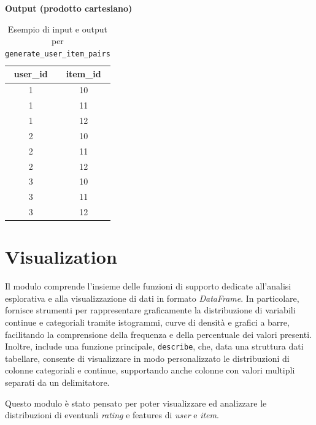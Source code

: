 \begin{itemize}
\begin{table}[H]
        \begin{minipage}{\textwidth}
            \centering
            \textbf{Output (prodotto cartesiano)}\\[0.5em]
            \begin{tabular}{|c|c|}
            \hline
            \textbf{user\_id} & \textbf{item\_id} \\
            \hline
            1 & 10 \\
            1 & 11 \\
            1 & 12 \\
            2 & 10 \\
            2 & 11 \\
            2 & 12 \\
            3 & 10 \\
            3 & 11 \\
            3 & 12 \\
            \hline
            \end{tabular}
        \end{minipage}
        \caption{Esempio di input e output per \texttt{generate\_user\_item\_pairs}}
    \end{table}
\end{itemize}


\section{Visualization}
Il modulo comprende l'insieme delle funzioni di supporto dedicate all'analisi esplorativa e alla visualizzazione di dati in formato \textit{DataFrame}. In particolare, fornisce strumenti per rappresentare graficamente la distribuzione di variabili continue e categoriali tramite istogrammi, curve di densità e grafici a barre, facilitando la comprensione della frequenza e della percentuale dei valori presenti. Inoltre, include una funzione principale, \texttt{describe}, che, data una struttura dati tabellare, consente di visualizzare in modo personalizzato le distribuzioni di colonne categoriali e continue, supportando anche colonne con valori multipli separati da un delimitatore.

Questo modulo è stato pensato per poter visualizzare ed analizzare le distribuzioni di eventuali \textit{rating} e features di \textit{user} e \textit{item}.

